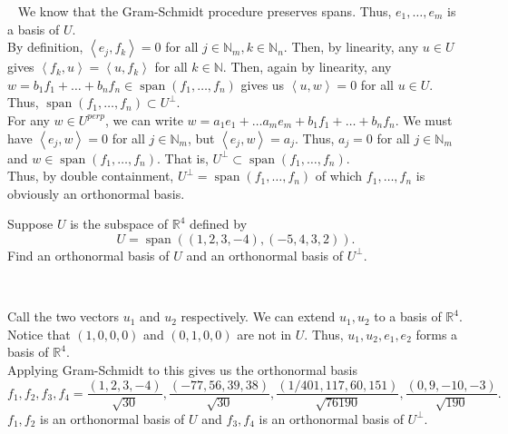 \documentclass[12 pt, letterpaper]{hmcpset}
\begin{document}
\begin{solution}~
	We know that the Gram-Schmidt procedure preserves spans. Thus, $e_{1}, \dots, e_{m}$ is a basis of $U$. \\
	
	By definition, $\left < e_{j}, f_{k} \right > = 0$ for all $j \in \mathbb{N}_{m}, k \in \mathbb{N}_{n}$. Then, by linearity, any $u \in U$ gives $\left < f_{k}, u \right > = \left < u, f_{k} \right >$ for all $k \in \mathbb{N}$. Then, again by linearity, any $w = b_{1} f_{1} + \dots + b_{n} f_{n} \in \operatorname{span}(f_{1}, \dots, f_{n})$ gives us $\left < u, w \right > = 0$ for all $u \in U$. Thus, $\operatorname{span}(f_{1}, \dots, f_{n}) \subset U^{\perp}$. \\

	For any $w \in U^{perp}$, we can write $w = a_{1} e_{1} + \dots a_{m} e_{m} + b_{1} f_{1} + \dots + b_{n} f_{n}$. We must have $\left < e_{j}, w \right > = 0$ for all $j \in \mathbb{N}_{m}$, but $\left < e_{j}, w \right > = a_{j}$. Thus, $a_{j} = 0$ for all $j \in \mathbb{N}_{m}$ and $w \in \operatorname{span}(f_{1}, \dots, f_{n})$. That is, $U^{\perp} \subset \operatorname{span}(f_{1}, \dots, f_{n})$. \\

	Thus, by double containment, $U^{\perp} = \operatorname{span}(f_{1}, \dots, f_{n})$ of which $f_{1}, \dots, f_{n}$ is obviously an orthonormal basis.
\end{solution}

\pagebreak

\begin{problem}[4]
	Suppose $U$ is the subspace of $\mathbb{R}^{4}$ defined by
	 \[
		U = \operatorname{span}((1, 2, 3, -4), (-5, 4, 3, 2)).
	\]
	Find an orthonormal basis of $U$ and an orthonormal basis of $U^{\perp}$.
\end{problem}

\begin{solution}~
	
	Call the two vectors $u_{1}$ and $u_{2}$ respectively. We can extend $u_{1}, u_{2}$ to a basis of $\mathbb{R}^{4}$. Notice that $(1, 0, 0, 0)$ and $(0, 1, 0, 0)$ are not in $U$. Thus, $u_{1}, u_{2}, e_{1}, e_{2}$ forms a basis of $\mathbb{R}^{4}$. \\

	Applying Gram-Schmidt to this gives us the orthonormal basis
	\[
		f_{1}, f_{2}, f_{3}, f_{4} = \frac{(1, 2, 3, -4)}{\sqrt{30}}, \frac{(-77, 56, 39, 38)}{\sqrt{30}}, \frac{(1/401, 117, 60, 151)}{\sqrt{76190}}, \frac{(0, 9, -10, -3)}{\sqrt{190}}.
	\]
	$f_{1}, f_{2}$ is an orthonormal basis of $U$ and $f_{3}, f_{4}$ is an orthonormal basis of $U^{\perp}$.
\end{solution}
\end{document}
